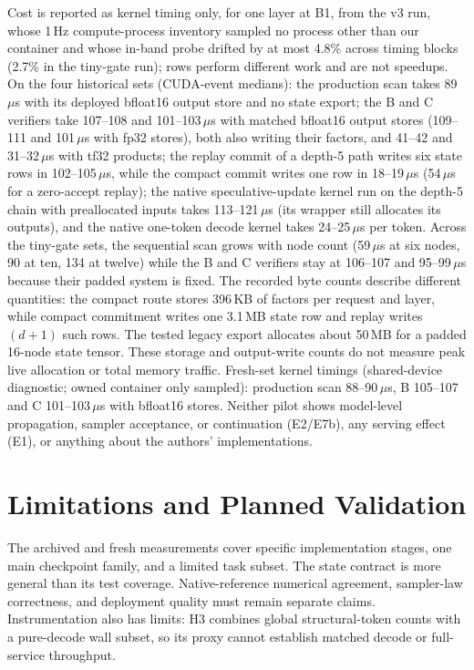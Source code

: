 \documentclass[conference]{IEEEtran}
\begin{document}
Cost is reported as kernel timing only, for one layer at B1, from the v3 run, whose 1\,Hz compute-process inventory sampled no process other than our container and whose in-band probe drifted by at most 4.8\% across timing blocks (2.7\% in the tiny-gate run); rows perform different work and are not speedups. On the four historical sets (CUDA-event medians): the production scan takes 89\,$\mu$s with its deployed bfloat16 output store and no state export; the B and C verifiers take 107--108 and 101--103\,$\mu$s with matched bfloat16 output stores (109--111 and 101\,$\mu$s with fp32 stores), both also writing their factors, and 41--42 and 31--32\,$\mu$s with tf32 products; the replay commit of a depth-5 path writes six state rows in 102--105\,$\mu$s, while the compact commit writes one row in 18--19\,$\mu$s (54\,$\mu$s for a zero-accept replay); the native speculative-update kernel run on the depth-5 chain with preallocated inputs takes 113--121\,$\mu$s (its wrapper still allocates its outputs), and the native one-token decode kernel takes 24--25\,$\mu$s per token. Across the tiny-gate sets, the sequential scan grows with node count (59\,$\mu$s at six nodes, 90 at ten, 134 at twelve) while the B and C verifiers stay at 106--107 and 95--99\,$\mu$s because their padded system is fixed. The recorded byte counts describe different quantities: the compact route stores 396\,KB of factors per request and layer, while compact commitment writes one 3.1\,MB state row and replay writes $(d{+}1)$ such rows. The tested legacy export allocates about 50\,MB for a padded 16-node state tensor. These storage and output-write counts do not measure peak live allocation or total memory traffic. Fresh-set kernel timings (shared-device diagnostic; owned container only sampled): production scan 88--90\,$\mu$s, B 105--107 and C 101--103\,$\mu$s with bfloat16 stores. Neither pilot shows model-level propagation, sampler acceptance, or continuation (E2/E7b), any serving effect (E1), or anything about the authors' implementations.

\section{Limitations and Planned Validation}
\label{sec:planned}
The archived and fresh measurements cover specific implementation stages, one main checkpoint family, and a limited task subset. The state contract is more general than its test coverage. Native-reference numerical agreement, sampler-law correctness, and deployment quality must remain separate claims. Instrumentation also has limits: H3 combines global structural-token counts with a pure-decode wall subset, so its proxy cannot establish matched decode or full-service throughput.
\end{document}
